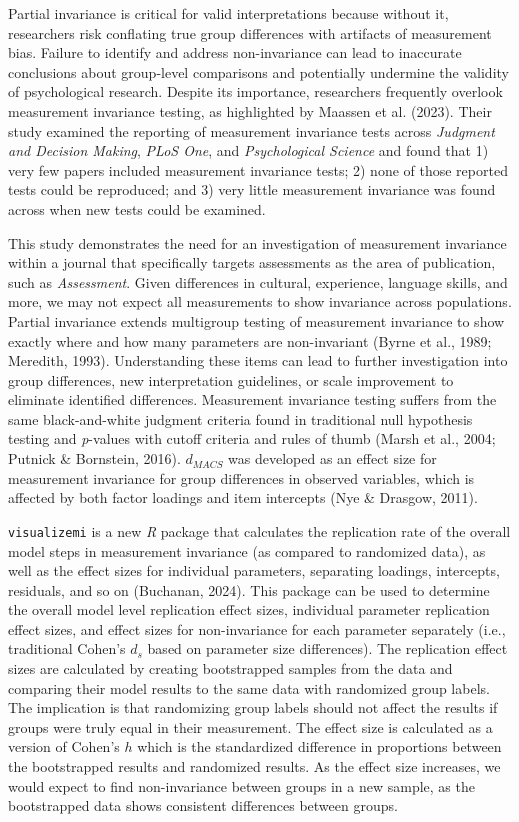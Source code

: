 \documentclass[
  man]{apa7}
\begin{document}
Partial invariance is critical for valid interpretations because without it, researchers risk conflating true group differences with artifacts of measurement bias. Failure to identify and address non-invariance can lead to inaccurate conclusions about group-level comparisons and potentially undermine the validity of psychological research. Despite its importance, researchers frequently overlook measurement invariance testing, as highlighted by Maassen et al. (2023). Their study examined the reporting of measurement invariance tests across \emph{Judgment and Decision Making}, \emph{PLoS One}, and \emph{Psychological Science} and found that 1) very few papers included measurement invariance tests; 2) none of those reported tests could be reproduced; and 3) very little measurement invariance was found across when new tests could be examined.

This study demonstrates the need for an investigation of measurement invariance within a journal that specifically targets assessments as the area of publication, such as \emph{Assessment}. Given differences in cultural, experience, language skills, and more, we may not expect all measurements to show invariance across populations. Partial invariance extends multigroup testing of measurement invariance to show exactly where and how many parameters are non-invariant (Byrne et al., 1989; Meredith, 1993). Understanding these items can lead to further investigation into group differences, new interpretation guidelines, or scale improvement to eliminate identified differences. Measurement invariance testing suffers from the same black-and-white judgment criteria found in traditional null hypothesis testing and \emph{p}-values with cutoff criteria and rules of thumb (Marsh et al., 2004; Putnick \& Bornstein, 2016). \(d_{MACS}\) was developed as an effect size for measurement invariance for group differences in observed variables, which is affected by both factor loadings and item intercepts (Nye \& Drasgow, 2011).

\texttt{visualizemi} is a new \emph{R} package that calculates the replication rate of the overall model steps in measurement invariance (as compared to randomized data), as well as the effect sizes for individual parameters, separating loadings, intercepts, residuals, and so on (Buchanan, 2024). This package can be used to determine the overall model level replication effect sizes, individual parameter replication effect sizes, and effect sizes for non-invariance for each parameter separately (i.e., traditional Cohen's \(d_s\) based on parameter size differences). The replication effect sizes are calculated by creating bootstrapped samples from the data and comparing their model results to the same data with randomized group labels. The implication is that randomizing group labels should not affect the results if groups were truly equal in their measurement. The effect size is calculated as a version of Cohen's \(h\) which is the standardized difference in proportions between the bootstrapped results and randomized results. As the effect size increases, we would expect to find non-invariance between groups in a new sample, as the bootstrapped data shows consistent differences between groups.
\end{document}
